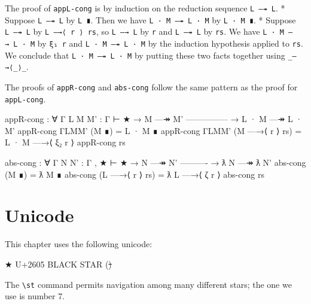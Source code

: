 The proof of \texttt{appL-cong} is by induction on the reduction
sequence \texttt{L\ —↠\ L\textquotesingle{}}. * Suppose
\texttt{L\ —↠\ L} by \texttt{L\ ∎}. Then we have
\texttt{L\ ·\ M\ —↠\ L\ ·\ M} by \texttt{L\ ·\ M\ ∎}. * Suppose
\texttt{L\ —↠\ L\textquotesingle{}\textquotesingle{}} by
\texttt{L\ —→⟨\ r\ ⟩\ rs}, so \texttt{L\ —→\ L\textquotesingle{}} by
\texttt{r} and
\texttt{L\textquotesingle{}\ —↠\ L\textquotesingle{}\textquotesingle{}}
by \texttt{rs}. We have \texttt{L\ ·\ M\ —→\ L\textquotesingle{}\ ·\ M}
by \texttt{ξ₁\ r} and
\texttt{L\textquotesingle{}\ ·\ M\ —↠\ L\textquotesingle{}\textquotesingle{}\ ·\ M}
by the induction hypothesis applied to \texttt{rs}. We conclude that
\texttt{L\ ·\ M\ —↠\ L\textquotesingle{}\textquotesingle{}\ ·\ M} by
putting these two facts together using \texttt{\_—→⟨\_⟩\_}.

The proofs of \texttt{appR-cong} and \texttt{abs-cong} follow the same
pattern as the proof for \texttt{appL-cong}.

\begin{fence}
\begin{code}
appR-cong : ∀ {Γ} {L M M' : Γ ⊢ ★}
         → M —↠ M'
           ---------------
         → L · M —↠ L · M'
appR-cong {Γ}{L}{M}{M'} (M ∎) = L · M ∎
appR-cong {Γ}{L}{M}{M'} (M —→⟨ r ⟩ rs) = L · M —→⟨ ξ₂ r ⟩ appR-cong rs
\end{code}
\end{fence}

\begin{fence}
\begin{code}
abs-cong : ∀ {Γ} {N N' : Γ , ★ ⊢ ★}
         → N —↠ N'
           ----------
         → ƛ N —↠ ƛ N'
abs-cong (M ∎) = ƛ M ∎
abs-cong (L —→⟨ r ⟩ rs) = ƛ L —→⟨ ζ r ⟩ abs-cong rs
\end{code}
\end{fence}

\hypertarget{unicode}{%
\section{Unicode}\label{unicode}}

This chapter uses the following unicode:

\begin{myDisplay}
★  U+2605  BLACK STAR (\st)
\end{myDisplay}

The \texttt{\textbackslash{}st} command permits navigation among many
different stars; the one we use is number 7.

